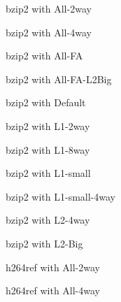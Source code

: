 \documentclass[cacheSimReport.tex]{subfiles}
\begin{document}
\footnotesize

\begin{center}
{\Large{bzip2 with All-2way}}
\end{center}

\pagebreak
\begin{center}
{\Large{bzip2 with All-4way}}
\end{center}

\pagebreak
\begin{center}
{\Large{bzip2 with All-FA}}
\end{center}

\pagebreak
\begin{center}
{\Large{bzip2 with All-FA-L2Big}}
\end{center}

\pagebreak
\begin{center}
{\Large{bzip2 with Default}}
\end{center}

\pagebreak
\begin{center}
{\Large{bzip2 with L1-2way}}
\end{center}

\pagebreak
\begin{center}
{\Large{bzip2 with L1-8way}}
\end{center}

\pagebreak
\begin{center}
{\Large{bzip2 with L1-small}}
\end{center}

\pagebreak
\begin{center}
{\Large{bzip2 with L1-small-4way}}
\end{center}

\pagebreak
\begin{center}
{\Large{bzip2 with L2-4way}}
\end{center}

\pagebreak
\begin{center}
{\Large{bzip2 with L2-Big}}
\end{center}

\pagebreak
\begin{center}
{\Large{h264ref with All-2way}}
\end{center}

\pagebreak
\begin{center}
{\Large{h264ref with All-4way}}
\end{center}
\end{document}
